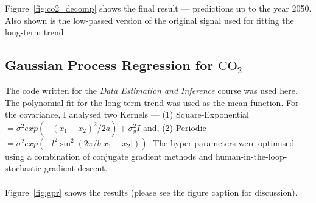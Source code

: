 \documentclass[11pt]{report}
\begin{document}
Figure~\ref{fig:co2_decomp} shows the final result --- predictions up to the year 2050. Also shown is the low-passed version of the original signal used for fitting the long-term trend.
\clearpage
\subsection*{Gaussian Process Regression for $\text{CO}_2$}
The code written for the \emph{Data Estimation and Inference}  course was used here. The polynomial fit for the long-term trend was used as the mean-function. For the covariance, I analysed two Kernels --- (1) Square-Exponential $= \sigma^2 exp\left(-(x_1-x_2)^2/2a\right) + \sigma_y^2I$ and, (2) Periodic $= \sigma^2 exp\left(-l^2\sin^2(2\pi/b|x_1-x_2|)\right)$. The hyper-parameters were optimised using a combination of conjugate gradient methods and human-in-the-loop-stochastic-gradient-descent.\\\\
Figure~\ref{fig:gpr} shows the results (please see the figure caption for discussion). 
\end{document}
